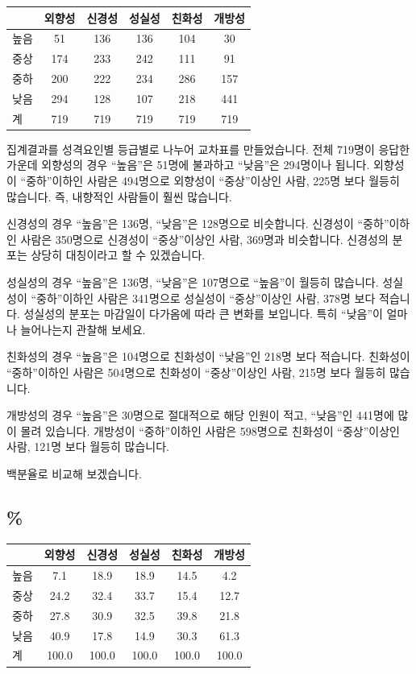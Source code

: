 \documentclass[
]{book}
\begin{document}
\begin{tabular}{l|c|c|c|c|c}
\hline
  & 외향성 & 신경성 & 성실성 & 친화성 & 개방성\\
\hline
높음 & 51 & 136 & 136 & 104 & 30\\
\hline
중상 & 174 & 233 & 242 & 111 & 91\\
\hline
중하 & 200 & 222 & 234 & 286 & 157\\
\hline
낮음 & 294 & 128 & 107 & 218 & 441\\
\hline
계 & 719 & 719 & 719 & 719 & 719\\
\hline
\end{tabular}

집계결과를 성격요인별 등급별로 나누어 교차표를 만들었습니다. 전체 719명이 응답한 가운데 외향성의 경우 ``높음''은 51명에 불과하고 ``낮음''은 294명이나 됩니다. 외향성이 ``중하''이하인 사람은 494명으로 외향성이 ``중상''이상인 사람, 225명 보다 월등히 많습니다. 즉, 내향적인 사람들이 훨씬 많습니다.

신경성의 경우 ``높음''은 136명, ``낮음''은 128명으로 비슷합니다. 신경성이 ``중하''이하인 사람은 350명으로 신경성이 ``중상''이상인 사람, 369명과 비슷합니다. 신경성의 분포는 상당히 대칭이라고 할 수 있겠습니다.

성실성의 경우 ``높음''은 136명, ``낮음''은 107명으로 ``높음''이 월등히 많습니다. 성실성이 ``중하''이하인 사람은 341명으로 성실성이 ``중상''이상인 사람, 378명 보다 적습니다. 성실성의 분포는 마감일이 다가옴에 따라 큰 변화를 보입니다. 특히 ``낮음''이 얼마나 늘어나는지 관찰해 보세요.

친화성의 경우 ``높음''은 104명으로 친화성이 ``낮음''인 218명 보다 적습니다. 친화성이 ``중하''이하인 사람은 504명으로 친화성이 ``중상''이상인 사람, 215명 보다 월등히 많습니다.

개방성의 경우 ``높음''은 30명으로 절대적으로 해당 인원이 적고, ``낮음''인 441명에 많이 몰려 있습니다. 개방성이 ``중하''이하인 사람은 598명으로 친화성이 ``중상''이상인 사람, 121명 보다 월등히 많습니다.

백분율로 비교해 보겠습니다.

\subsection{\%}\label{section-27}

\begin{tabular}{l|c|c|c|c|c}
\hline
  & 외향성 & 신경성 & 성실성 & 친화성 & 개방성\\
\hline
높음 & 7.1 & 18.9 & 18.9 & 14.5 & 4.2\\
\hline
중상 & 24.2 & 32.4 & 33.7 & 15.4 & 12.7\\
\hline
중하 & 27.8 & 30.9 & 32.5 & 39.8 & 21.8\\
\hline
낮음 & 40.9 & 17.8 & 14.9 & 30.3 & 61.3\\
\hline
계 & 100.0 & 100.0 & 100.0 & 100.0 & 100.0\\
\hline
\end{tabular}
\end{document}
